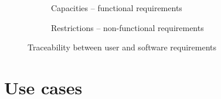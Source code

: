 \begin{figure}[h]
  \centering
  \begin{subfigure}{.45\textwidth}
    \centering
    \caption{Capacities -- functional requirements}
    \label{subfig:ca-fc-traceability}
  \end{subfigure}
  \begin{subfigure}{.45\textwidth}
    \centering
    \caption{Restrictions -- non-functional requirements}
    \label{subfig:re-nf-traceability}
  \end{subfigure}
  \caption{Traceability between user and software requirements}
  \label{fig:req-traceability}
\end{figure}



\section{Use cases}\label{sec:use-cases}



\FloatBarrier




